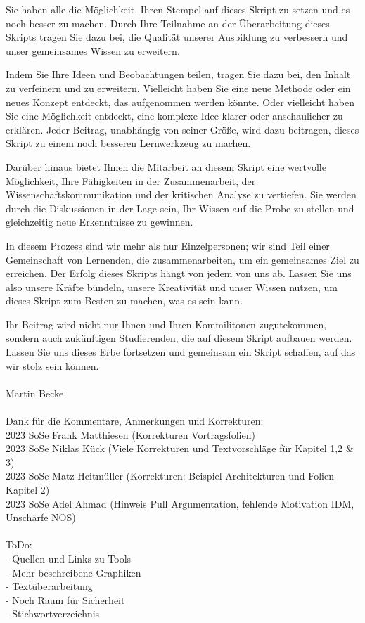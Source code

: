 \documentclass[a4paper]{article}
\begin{document}
Sie haben alle die Möglichkeit, Ihren Stempel auf dieses Skript zu setzen und es noch besser zu machen. Durch Ihre Teilnahme an der Überarbeitung dieses Skripts tragen Sie dazu bei, die Qualität unserer Ausbildung zu verbessern und unser gemeinsames Wissen zu erweitern.

Indem Sie Ihre Ideen und Beobachtungen teilen, tragen Sie dazu bei, den Inhalt zu verfeinern und zu erweitern. Vielleicht haben Sie eine neue Methode oder ein neues Konzept entdeckt, das aufgenommen werden könnte. Oder vielleicht haben Sie eine Möglichkeit entdeckt, eine komplexe Idee klarer oder anschaulicher zu erklären. Jeder Beitrag, unabhängig von seiner Größe, wird dazu beitragen, dieses Skript zu einem noch besseren Lernwerkzeug zu machen.

Darüber hinaus bietet Ihnen die Mitarbeit an diesem Skript eine wertvolle Möglichkeit, Ihre Fähigkeiten in der Zusammenarbeit, der Wissenschaftskommunikation und der kritischen Analyse zu vertiefen. Sie werden durch die Diskussionen in der Lage sein, Ihr Wissen auf die Probe zu stellen und gleichzeitig neue Erkenntnisse zu gewinnen.

In diesem Prozess sind wir mehr als nur Einzelpersonen; wir sind Teil einer Gemeinschaft von Lernenden, die zusammenarbeiten, um ein gemeinsames Ziel zu erreichen. Der Erfolg dieses Skripts hängt von jedem von uns ab. Lassen Sie uns also unsere Kräfte bündeln, unsere Kreativität und unser Wissen nutzen, um dieses Skript zum Besten zu machen, was es sein kann.

Ihr Beitrag wird nicht nur Ihnen und Ihren Kommilitonen zugutekommen, sondern auch zukünftigen Studierenden, die auf diesem Skript aufbauen werden. Lassen Sie uns dieses Erbe fortsetzen und gemeinsam ein Skript schaffen, auf das wir stolz sein können.
\\\\
Martin Becke
\\\\
Dank für die Kommentare, Anmerkungen und Korrekturen: \\
2023 SoSe Frank Matthiesen (Korrekturen Vortragsfolien) \\
2023 SoSe Niklas Kück (Viele Korrekturen und Textvorschläge für Kapitel 1,2 \& 3)\\
2023 SoSe Matz Heitmüller (Korrekturen: Beispiel-Architekturen und Folien Kapitel 2) \\
2023 SoSe Adel Ahmad (Hinweis Pull Argumentation, fehlende Motivation IDM, Unschärfe NOS) \\
\\
ToDo:\\
- Quellen und Links zu Tools\\
- Mehr beschreibene Graphiken\\
- Textüberarbeitung\\
- Noch Raum für Sicherheit\\
- Stichwortverzeichnis
\newpage
\tableofcontents
\newpage
\end{document}
